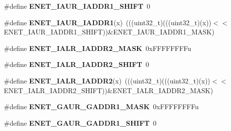 \begin{DoxyCompactItemize}
\item 
\#define {\bfseries E\+N\+E\+T\+\_\+\+I\+A\+U\+R\+\_\+\+I\+A\+D\+D\+R1\+\_\+\+S\+H\+I\+FT}~0\hypertarget{group__ENET__Register__Masks_ga305ef40dd7fb1f6e7e0f4ba815db5210}{}\label{group__ENET__Register__Masks_ga305ef40dd7fb1f6e7e0f4ba815db5210}

\item 
\#define {\bfseries E\+N\+E\+T\+\_\+\+I\+A\+U\+R\+\_\+\+I\+A\+D\+D\+R1}(x)~(((uint32\+\_\+t)(((uint32\+\_\+t)(x))$<$$<$E\+N\+E\+T\+\_\+\+I\+A\+U\+R\+\_\+\+I\+A\+D\+D\+R1\+\_\+\+S\+H\+I\+FT))\&E\+N\+E\+T\+\_\+\+I\+A\+U\+R\+\_\+\+I\+A\+D\+D\+R1\+\_\+\+M\+A\+SK)\hypertarget{group__ENET__Register__Masks_ga43bd5e0645a476549c8662de0249e426}{}\label{group__ENET__Register__Masks_ga43bd5e0645a476549c8662de0249e426}

\item 
\#define {\bfseries E\+N\+E\+T\+\_\+\+I\+A\+L\+R\+\_\+\+I\+A\+D\+D\+R2\+\_\+\+M\+A\+SK}~0x\+F\+F\+F\+F\+F\+F\+F\+Fu\hypertarget{group__ENET__Register__Masks_gae646937c25a2d20a02a2afc7937f9f97}{}\label{group__ENET__Register__Masks_gae646937c25a2d20a02a2afc7937f9f97}

\item 
\#define {\bfseries E\+N\+E\+T\+\_\+\+I\+A\+L\+R\+\_\+\+I\+A\+D\+D\+R2\+\_\+\+S\+H\+I\+FT}~0\hypertarget{group__ENET__Register__Masks_gadbb5d746c302629f7ed6dab197c0ed89}{}\label{group__ENET__Register__Masks_gadbb5d746c302629f7ed6dab197c0ed89}

\item 
\#define {\bfseries E\+N\+E\+T\+\_\+\+I\+A\+L\+R\+\_\+\+I\+A\+D\+D\+R2}(x)~(((uint32\+\_\+t)(((uint32\+\_\+t)(x))$<$$<$E\+N\+E\+T\+\_\+\+I\+A\+L\+R\+\_\+\+I\+A\+D\+D\+R2\+\_\+\+S\+H\+I\+FT))\&E\+N\+E\+T\+\_\+\+I\+A\+L\+R\+\_\+\+I\+A\+D\+D\+R2\+\_\+\+M\+A\+SK)\hypertarget{group__ENET__Register__Masks_ga18aa21555b866b9c80f3e29a43b650cc}{}\label{group__ENET__Register__Masks_ga18aa21555b866b9c80f3e29a43b650cc}

\item 
\#define {\bfseries E\+N\+E\+T\+\_\+\+G\+A\+U\+R\+\_\+\+G\+A\+D\+D\+R1\+\_\+\+M\+A\+SK}~0x\+F\+F\+F\+F\+F\+F\+F\+Fu\hypertarget{group__ENET__Register__Masks_ga6ae8043e613c7d0e8962e60b02b9bb04}{}\label{group__ENET__Register__Masks_ga6ae8043e613c7d0e8962e60b02b9bb04}

\item 
\#define {\bfseries E\+N\+E\+T\+\_\+\+G\+A\+U\+R\+\_\+\+G\+A\+D\+D\+R1\+\_\+\+S\+H\+I\+FT}~0\hypertarget{group__ENET__Register__Masks_ga38d4ad90575393e3e79e9436421a71b4}{}\label{group__ENET__Register__Masks_ga38d4ad90575393e3e79e9436421a71b4}


\end{DoxyCompactItemize}
